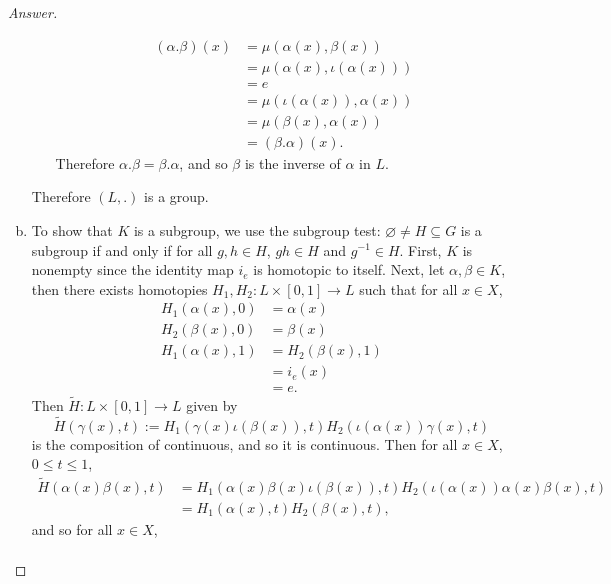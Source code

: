 \documentclass[12pt]{article}
\newcommand\inv[1]{#1^{-1}}
\newcommand\paren[1]{\left( #1 \right)}
\theoremstyle{definition}
\begin{document}
\begin{proof}[Answer]
\begin{enumerate}[(a)]
\begin{itemize}
            \begin{align*}
                (\alpha.\beta)(x) & = \mu \paren{ \alpha(x) , \beta(x) } \\
                & = \mu \paren{ \alpha(x) , \iota(\alpha(x)) } \\
                & = e \\
                & = \mu \paren{ \iota(\alpha(x)) , \alpha(x) } \\
                & = \mu \paren{ \beta(x) , \alpha(x) } \\
                & = (\beta.\alpha)(x).
            \end{align*}
            Therefore $\alpha . \beta = \beta . \alpha$, and so $\beta$ is the inverse of $\alpha$ in $L$.
        \end{itemize}
        Therefore $(L,.)$ is a group.
        \item To show that $K$ is a subgroup, we use the subgroup test: $\varnothing \neq H \subseteq G$ is a subgroup if and only if for all $g , h \in H$, $gh \in H$ and $\inv{g} \in H$. First, $K$ is nonempty since the identity map $i_e$ is homotopic to itself. Next, let $\alpha , \beta \in K$, then there exists homotopies $H_1, H_2 : L \times [0,1] \to L$ such that for all $x \in X$,
        \begin{align*}
            H_1 \paren{ \alpha(x) , 0 } & = \alpha(x) \\
            H_2 \paren{ \beta(x) , 0 } & = \beta(x) \\
            H_1 \paren{ \alpha(x) , 1 } & = H_2 \paren{ \beta(x) , 1 } \\
            & = i_e(x) \\
            & = e.
        \end{align*}
        Then $\tilde{H} : L \times [0,1] \to L$ given by 
        \[
            \tilde{H} \paren{ \gamma(x) , t } := H_1 \paren{ \gamma(x) \iota(\beta(x)) , t } H_2 \paren{ \iota(\alpha(x)) \gamma(x) , t } 
        \]
        is the composition of continuous, and so it is continuous. Then for all $x \in X$, $0 \leq t \leq 1$,
        \begin{align*}
            \tilde{H} \paren{ \alpha(x) \beta(x) , t } & = H_1 \paren{ \alpha(x) \beta(x) \iota(\beta(x)) , t } H_2 \paren{ \iota(\alpha(x)) \alpha(x) \beta(x) , t } \\
            & = H_1 \paren{ \alpha(x) , t } H_2 \paren{ \beta(x) , t },
        \end{align*}
        and so for all $x \in X$,
        \begin{align*}

\end{align*}
\end{enumerate}
\end{proof}
\end{document}
